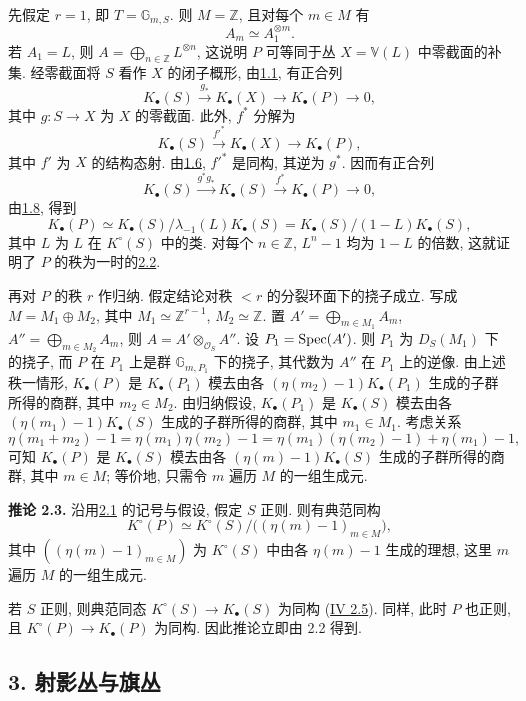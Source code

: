 先假定 $r=1$, 即 $T=\mathbb G_{m,S}$. 则 $M=\mathbb Z$, 且对每个 $m\in M$ 有
\[
 A_m\simeq A_1^{\otimes m}.
\]
若 $A_1=L$, 则 $A=\bigoplus_{n\in\mathbb Z}L^{\otimes n}$, 这说明 $P$ 可等同于丛 $X=\mathbb V(L)$ 中零截面的补集. 经零截面将 $S$ 看作 $X$ 的闭子概形, 由\hyperlink{sga6.e09.prop.1-1}{1.1}, 有正合列
\[
 K_\bullet(S)\xrightarrow{g_*}K_\bullet(X)\longrightarrow K_\bullet(P)\longrightarrow 0,
\]
其中 $g:S\to X$ 为 $X$ 的零截面. 此外, $f^*$ 分解为
\[
 K_\bullet(S)\xrightarrow{f'^*}K_\bullet(X)\longrightarrow K_\bullet(P),
\]
其中 $f'$ 为 $X$ 的结构态射. 由\hyperlink{sga6.e09.prop.1-6}{1.6}, $f'^*$ 是同构, 其逆为 $g^*$. 因而有正合列
\[
 K_\bullet(S)\xrightarrow{g^*g_*}K_\bullet(S)\xrightarrow{f^*}K_\bullet(P)\longrightarrow 0,
\]
由\hyperlink{sga6.e09.prop.1-8}{1.8}, 得到
\[
 K_\bullet(P)\simeq K_\bullet(S)/\lambda_{-1}(L)K_\bullet(S)=K_\bullet(S)/(1-L)K_\bullet(S),
\]
其中 $L$ 为 $L$ 在 $K^\circ(S)$ 中的类. 对每个 $n\in\mathbb Z$, $L^n-1$ 均为 $1-L$ 的倍数, 这就证明了 $P$ 的秩为一时的\hyperlink{sga6.e09.prop.2-2}{2.2}.

再对 $P$ 的秩 $r$ 作归纳. 假定结论对秩 $<r$ 的分裂环面下的挠子成立. 写成 $M=M_1\oplus M_2$, 其中 $M_1\simeq\mathbb Z^{r-1}$, $M_2\simeq\mathbb Z$. 置 $A'=\bigoplus_{m\in M_1}A_m$, $A''=\bigoplus_{m\in M_2}A_m$, 则 $A=A'\otimes_{\mathcal O_S}A''$.
设 $P_1=\operatorname{Spec}(A')$. 则 $P_1$ 为 $D_S(M_1)$ 下的挠子, 而 $P$ 在 $P_1$ 上是群 $\mathbb G_{m,P_1}$ 下的挠子, 其代数为 $A''$ 在 $P_1$ 上的逆像. 由上述秩一情形, $K_\bullet(P)$ 是 $K_\bullet(P_1)$ 模去由各 $(\eta(m_2)-1)K_\bullet(P_1)$ 生成的子群所得的商群, 其中 $m_2\in M_2$. 由归纳假设, $K_\bullet(P_1)$ 是 $K_\bullet(S)$ 模去由各 $(\eta(m_1)-1)K_\bullet(S)$ 生成的子群所得的商群, 其中 $m_1\in M_1$. 考虑关系
\[
 \eta(m_1+m_2)-1=\eta(m_1)\eta(m_2)-1
 =\eta(m_1)(\eta(m_2)-1)+\eta(m_1)-1,
\]
可知 $K_\bullet(P)$ 是 $K_\bullet(S)$ 模去由各 $(\eta(m)-1)K_\bullet(S)$ 生成的子群所得的商群, 其中 $m\in M$; 等价地, 只需令 $m$ 遍历 $M$ 的一组生成元.

\textbf{推论 2.3.} 沿用\hyperlink{sga6.e09.para.2-1}{2.1} 的记号与假设, 假定 $S$ 正则. 则有典范同构
\[
 K^\circ(P)\simeq K^\circ(S)/\bigl((\eta(m)-1)_{m\in M}\bigr),
\]
其中 $((\eta(m)-1)_{m\in M})$ 为 $K^\circ(S)$ 中由各 $\eta(m)-1$ 生成的理想, 这里 $m$ 遍历 $M$ 的一组生成元.

若 $S$ 正则, 则典范同态 $K^\circ(S)\to K_\bullet(S)$ 为同构 (\hyperlink{sga6.e04.para.2-5}{IV 2.5}). 同样, 此时 $P$ 也正则, 且 $K^\circ(P)\to K_\bullet(P)$ 为同构. 因此推论立即由 2.2 得到.

\subsection*{3. 射影丛与旗丛}

